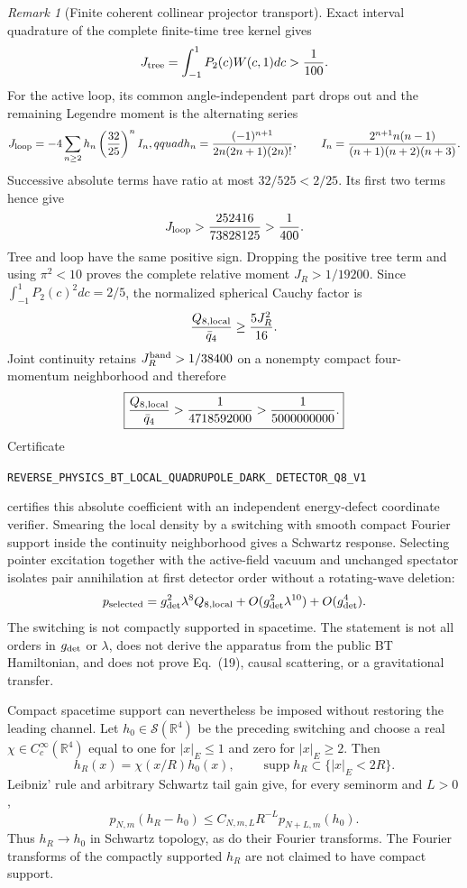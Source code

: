 \documentclass[11pt]{article}
\theoremstyle{definition}
\theoremstyle{remark}
\newtheorem{remark}[theorem]{Remark}
\begin{document}
\begin{remark}[Finite coherent collinear projector transport]
Exact interval quadrature of the complete finite-time tree kernel gives
\[
 J_{\rm tree}=\int_{-1}^{1}P_2(c)W(c,1)dc>{1\over100}.
\]
For the active loop, its common angle-independent part drops out and the
remaining Legendre moment is the alternating series
\[
 J_{\rm loop}=-4\sum_{n\geq2}h_n
 \left({32\over25}\right)^n I_n,qquad
 h_n={(-1)^{n+1}\over2n(2n+1)(2n)!},\qquad
 I_n={2^{n+1}n(n-1)\over(n+1)(n+2)(n+3)}.
\]
Successive absolute terms have ratio at most $32/525<2/25$.  Its first two
terms hence give
\[
 J_{\rm loop}>{252416\over73828125}>{1\over400}.
\]
Tree and loop have the same positive sign.  Dropping the positive tree term
and using $\pi^2<10$ proves the complete relative moment
$J_R>1/19200$.  Since
$\int_{-1}^{1}P_2(c)^2dc=2/5$, the normalized spherical Cauchy factor is
\[
 {Q_{8,\mathrm{local}}\over\bar q_4}\geq {5J_R^2\over16}.
\]
Joint continuity retains $J_R^{\rm band}>1/38400$ on a nonempty compact
four-momentum neighborhood and therefore
\[
 \boxed{{Q_{8,\mathrm{local}}\over\bar q_4}
 >{1\over4718592000}>{1\over5000000000}.}
\]
Certificate
\par\noindent
\texttt{REVERSE\_PHYSICS\_BT\_LOCAL\_QUADRUPOLE\_DARK\_}
\allowbreak\texttt{DETECTOR\_Q8\_V1}
\par\noindent
certifies this absolute coefficient with an independent energy-defect
coordinate verifier.  Smearing the local density by a switching with smooth
compact Fourier support inside the continuity neighborhood gives a Schwartz
response.  Selecting pointer excitation together with the active-field
vacuum and unchanged spectator isolates pair annihilation at first detector
order without a rotating-wave deletion:
\[
 p_{\rm selected}=g_{\rm det}^2\lambda^8Q_{8,\mathrm{local}}
 +O(g_{\rm det}^2\lambda^{10})+O(g_{\rm det}^4).
\]
The switching is not compactly supported in spacetime.  The statement is not
all orders in $g_{\rm det}$ or $\lambda$, does not derive the apparatus from
the public BT Hamiltonian, and does not prove Eq.~(19), causal scattering, or
a gravitational transfer.

Compact spacetime support can nevertheless be imposed without restoring the
leading channel.  Let $h_0\in\mathcal S(\mathbb R^4)$ be the preceding
switching and choose a real $\chi\in C_c^\infty(\mathbb R^4)$ equal to one
for $|x|_E\leq1$ and zero for $|x|_E\geq2$.  Then
\[
 h_R(x)=\chi(x/R)h_0(x),\qquad
 \operatorname{supp}h_R\subset\{|x|_E<2R\}.
\]
Leibniz' rule and arbitrary Schwartz tail gain give, for every seminorm and
$L>0$,
\[
 p_{N,m}(h_R-h_0)
 \leq C_{N,m,L}R^{-L}p_{N+L,m}(h_0).
\]
Thus $h_R\to h_0$ in Schwartz topology, as do their Fourier transforms.
The Fourier transforms of the compactly supported $h_R$ are not claimed to
have compact support.


\end{remark}
\end{document}

